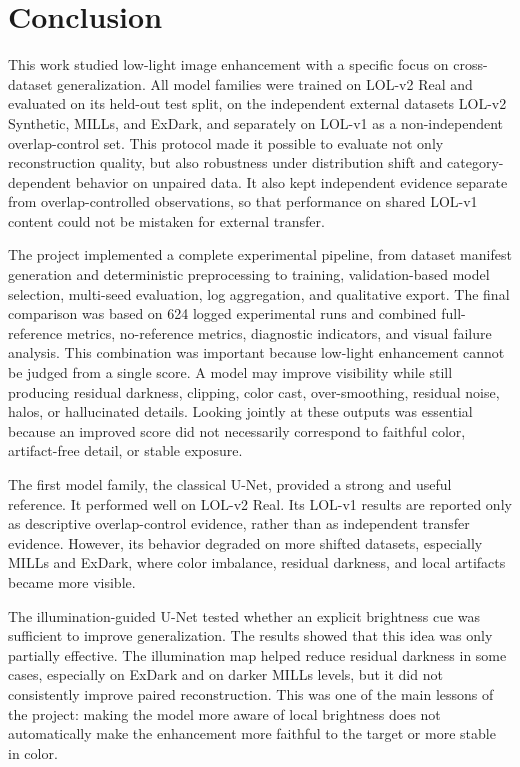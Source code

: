 \section{Conclusion}

This work studied low-light image enhancement with a specific focus on cross-dataset generalization. All model families were trained on LOL-v2 Real and evaluated on its held-out test split, on the independent external datasets LOL-v2 Synthetic, MILLs, and ExDark, and separately on LOL-v1 as a non-independent overlap-control set. This protocol made it possible to evaluate not only reconstruction quality, but also robustness under distribution shift and category-dependent behavior on unpaired data. It also kept independent evidence separate from overlap-controlled observations, so that performance on shared LOL-v1 content could not be mistaken for external transfer.

The project implemented a complete experimental pipeline, from dataset manifest generation and deterministic preprocessing to training, validation-based model selection, multi-seed evaluation, log aggregation, and qualitative export. The final comparison was based on 624 logged experimental runs and combined full-reference metrics, no-reference metrics, diagnostic indicators, and visual failure analysis. This combination was important because low-light enhancement cannot be judged from a single score. A model may improve visibility while still producing residual darkness, clipping, color cast, over-smoothing, residual noise, halos, or hallucinated details. Looking jointly at these outputs was essential because an improved score did not necessarily correspond to faithful color, artifact-free detail, or stable exposure.

The first model family, the classical U-Net, provided a strong and useful reference. It performed well on LOL-v2 Real. Its LOL-v1 results are reported only as descriptive overlap-control evidence, rather than as independent transfer evidence. However, its behavior degraded on more shifted datasets, especially MILLs and ExDark, where color imbalance, residual darkness, and local artifacts became more visible.

The illumination-guided U-Net tested whether an explicit brightness cue was sufficient to improve generalization. The results showed that this idea was only partially effective. The illumination map helped reduce residual darkness in some cases, especially on ExDark and on darker MILLs levels, but it did not consistently improve paired reconstruction. This was one of the main lessons of the project: making the model more aware of local brightness does not automatically make the enhancement more faithful to the target or more stable in color.

